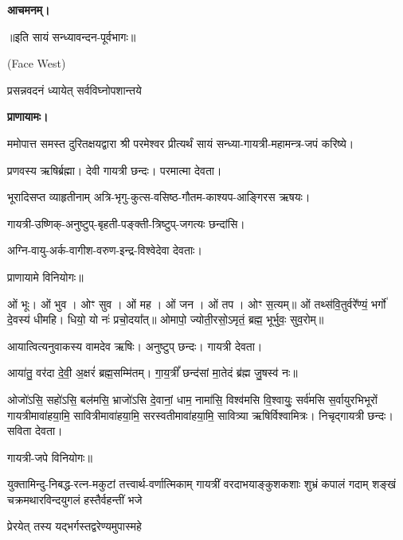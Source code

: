 \textbf{आचमनम्।}


\centerline{॥इति सायं सन्ध्यावन्दन-पूर्वभागः॥}



{\scriptsize (Face West)}

{प्रसन्नवदनं ध्यायेत् सर्वविघ्नोपशान्तये}

\textbf{प्राणायामः।}

ममोपात्त समस्त दुरितक्षयद्वारा श्री परमेश्वर प्रीत्यर्थं सायं सन्ध्या-गायत्री-महामन्त्र-जपं करिष्ये।


प्रणवस्य ऋषिर्ब्रह्मा।
देवी गायत्री छन्दः।
परमात्मा देवता।

भूरादिसप्त व्याहृतीनाम् अत्रि-भृगु-कुत्स-वसिष्ठ-गौतम-काश्यप-आङ्गिरस ऋषयः।

गायत्री-उष्णिक्-अनुष्टुप्-बृहती-पङ्क्ती-त्रिष्टुप्-जगत्यः छन्दांसि।

अग्नि-वायु-अर्क-वागीश-वरुण-इन्द्र-विश्वेदेवा देवताः।
      
प्राणायामे विनियोगः॥


ओं भूः। ओं भुव। ओꣳ सुव। ओं मह। ओं जन। ओं तप। ओꣳ स॒त्यम्॥
ओं तथ्स॑वि॒तुर्वरे᳚ण्यं॒ भर्गो॑ दे॒वस्य॑ धीमहि। धियो॒ यो नः॑ प्रचो॒दया᳚त्॥
ओमापो॒ ज्योती॒रसो॒ऽमृतं॒ ब्रह्म॒ भूर्भुवः॒ सुव॒रोम्॥




आयात्वित्यनुवाकस्य वामदेव ऋषिः।
अनुष्टुप् छन्दः।
गायत्री देवता।

आया॑तु॒ वर॑दा दे॒वी॒ अ॒क्षरं॑ ब्रह्म॒सम्मि॑तम्। गा॒य॒त्रीं᳚ छन्द॑सां मा॒तेदं ब्र॑ह्म जु॒षस्व॑ नः॥

ओजो॑ऽसि॒ सहो॑ऽसि॒ बल॑मसि॒ भ्राजो॑ऽसि दे॒वानां॒ धाम॒ नामा॑सि॒ विश्व॑मसि वि॒श्वायुः॒ सर्व॑मसि स॒र्वायुरभिभूरों गायत्रीमावा॑हया॒मि॒ सावित्रीमावा॑हया॒मि॒ सरस्वतीमावा॑ह\-या॒मि॒ सावित्र्या ऋषिर्विश्वामित्रः। निचृद्गायत्री छन्दः। सविता देवता।

गायत्री-जपे विनियोगः॥



{युक्तामिन्दु-निबद्ध-रत्न-मकुटां तत्त्वार्थ-वर्णात्मिकाम्}
{गायत्रीं वरदाभयाङ्कुशकशाः शुभ्रं कपालं गदाम्}
{शङ्खं चक्रमथारविन्दयुगलं हस्तैर्वहन्तीं भजे}

{प्रेरयेत् तस्य यद्भर्गस्तद्वरेण्यमुपास्महे}


